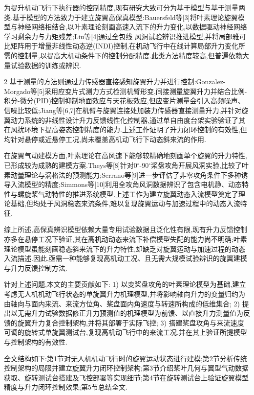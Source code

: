 \documentclass{aas}
\begin{document}
为提升机动飞行下执行器的控制精度,现有研究大致可分为基于模型与基于测量两类.基于模型的方法致力于建立旋翼高保真模型:Bauersfeld等[3]将叶素理论旋翼模型与神经网络相结合,以叶素理论刻画高速入流下的升力变化,以数据驱动神经网络学习剩余力与力矩残差;Liu等[4]通过全包线
风洞试验辨识推进模型,并将局部雅可比矩阵用于增量非线性动态逆(INDI)控制,在机动飞行中在线计算局部升力变化所需的控制量,以提高大机动条件下的控制分配精度.此类方法精度较高,但普遍依赖大量试验数据的训练或辨识.
\onecolumn\begin{multicols}{2}%
基于测量的方法则通过力传感器直接感知旋翼升力并进行控制:Gonzalez-Morgado等[5]采用应变片式测力方式检测机臂形变,间接测量旋翼升力并结合比例-积分-微分(PID)控制抑制地面效应与天花板效应,但应变片测量会引入高频噪声、信噪比较低;Jiang等[6,7]在机臂与旋翼连接处加装力传感器直接测量升力,并针对旋翼动力系统的非线性设计升力反馈线性化控制器,通过单自由度台架实验验证了其在风扰环境下提高姿态控制精度的能力.上述工作证明了升力闭环控制的有效性,但均针对悬停或近悬停工况,尚未覆盖高机动飞行下动态斜来流的作用.

在旋翼气动建模方面,叶素理论在高风速下能够较精确地刻画单个旋翼的升力特性,已形成较为成熟的建模方案.Theys等[8]针对0$^{\circ}$-90$^{\circ}$桨盘攻角开展风洞实验,比较了叶素动量理论与涡格法的预测能力;Serrano等[9]进一步评估了非零攻角条件下多种诱导入流模型的精度;Simmons等[10]利用全攻角风洞数据辨识了包含电机静、动态特性与螺旋桨气动特性的推进系统模型.上述工作为建立旋翼动态入流模型奠定了理论基础,但均处于风洞稳态来流条件,难以复现旋翼运动与加速过程中的动态入流特征.

综上所述,高保真辨识模型依赖大量专用试验数据且泛化性有限,现有升力反馈控制亦多在悬停工况下验证,其在高机动动态来流下补偿模型失配的能力尚不明确;叶素理论模型虽能刻画稳态斜来流下的升力特性,却缺乏对旋翼运动与加速过程的动态入流描述.因此,亟需一种能够复现高机动工况、且无需大规模试验辨识的旋翼建模与升力反馈控制方法.

针对上述问题,本文的主要贡献如下:
1) 以变桨盘攻角的叶素理论模型为基础,建立考虑无人机机动飞行状态的单旋翼升力机理模型,并将影响轴向升力的变量归约为由轴向与面内来流、来流方位角、桨盘面内角速度与转速所构成的低维集合;
2) 提出以无需升力试验数据修正升力预测值的机理模型为前馈、以直接升力测量值为反馈的旋翼升力复合控制架构,并将其部署于实际飞控;
3) 搭建桨盘攻角与来流速度可调的旋转式单旋翼测试台,复现高机动飞行中的来流工况,并在其上验证所提模型与控制架构的有效性.

全文结构如下:第1节对无人机机动飞行时的旋翼运动状态进行建模;第2节分析传统控制架构的局限并建立旋翼升力闭环控制架构;第3节介绍桨叶几何与翼型气动数据获取、旋转测试台搭建及飞控部署等实现细节;第4节在旋转测试台上验证旋翼模型精度与升力闭环控制效果;第5节总结全文.

\end{multicols}
\end{document}
